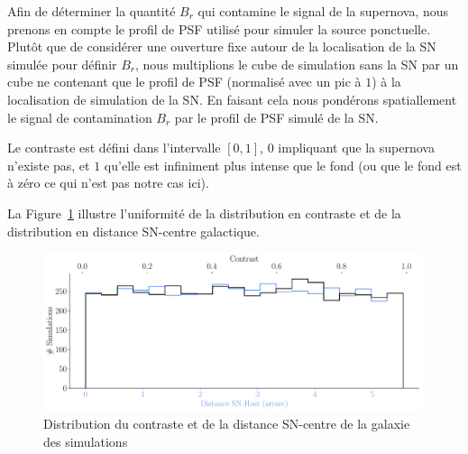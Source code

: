 \documentclass[../main/main.tex]{subfiles}
\begin{document}
Afin de déterminer la quantité $B_{r}$ qui contamine le signal de la
supernova, nous prenons en compte le profil de PSF utilisé pour
simuler la source ponctuelle.
Plutôt que de considérer une ouverture fixe
autour de la localisation de la SN simulée pour définir $B_{r}$, nous
multiplions le cube de simulation sans la SN par un cube ne contenant
que le profil de PSF (normalisé avec un pic à $1$) à la localisation de
simulation de la SN. En faisant cela nous pondérons spatiallement le
signal de contamination $B_{r}$ par le profil de PSF simulé de la SN.

Le contraste est défini dans l'intervalle $[0,1]$, $0$ impliquant
que la supernova n'existe pas, et $1$ qu'elle est infiniment plus
intense que le fond (ou que le fond est à zéro ce qui n'est pas notre
cas ici).

La Figure~\ref{fig:host_contrast_simu} illustre l'uniformité de la
distribution en contraste et de la distribution en distance SN-centre
galactique.

\begin{figure}[ht]
  \centering
  \includegraphics[width=0.99\textwidth]{../figures/08_simu/simu_host_contrast.pdf}
  \caption[Distribution du contraste et de la distance SN-centre de la
  galaxie des simulations.]{Distribution du contraste et de la distance SN-centre de la
  galaxie des simulations}
\label{fig:host_contrast_simu}
\end{figure}
\end{document}
